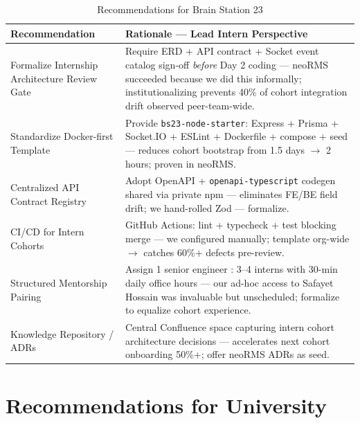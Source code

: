 \begin{table}[H]
\centering
\caption{Recommendations for Brain Station 23}
\label{tab:rec_org}
\begin{tabularx}{\textwidth}{@{}p{}X@{}}
\toprule
\textbf{Recommendation} & \textbf{Rationale --- Lead Intern Perspective} \\
\midrule
Formalize Internship Architecture Review Gate & Require ERD + API contract + Socket event catalog sign-off \textit{before} Day 2 coding --- neoRMS succeeded because we did this informally; institutionalizing prevents 40\% of cohort integration drift observed peer-team-wide. \\
Standardize Docker-first Template & Provide \texttt{bs23-node-starter}: Express + Prisma + Socket.IO + ESLint + Dockerfile + compose + seed --- reduces cohort bootstrap from 1.5 days $\rightarrow$ 2 hours; proven in neoRMS. \\
Centralized API Contract Registry & Adopt OpenAPI + \texttt{openapi-typescript} codegen shared via private npm --- eliminates FE/BE field drift; we hand-rolled Zod --- formalize. \\
CI/CD for Intern Cohorts & GitHub Actions: lint + typecheck + test blocking merge --- we configured manually; template org-wide $\rightarrow$ catches 60\%+ defects pre-review. \\
Structured Mentorship Pairing & Assign 1 senior engineer : 3--4 interns with 30-min daily office hours --- our ad-hoc access to Safayet Hossain was invaluable but unscheduled; formalize to equalize cohort experience. \\
Knowledge Repository / ADRs & Central Confluence space capturing intern cohort architecture decisions --- accelerates next cohort onboarding 50\%+; offer neoRMS ADRs as seed. \\
\bottomrule
\end{tabularx}
\end{table}

\section{Recommendations for University}

